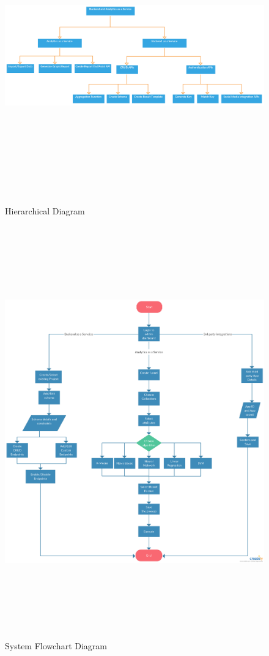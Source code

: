 \documentclass[a4paper,12pt]{report}
\begin{document}
        \begin{figure}[h] \centering
          \includegraphics[width=9.0in, height=5.0in ,angle=90]{images/Hierarchical-Diagram.png}
        \caption{ Hierarchical Diagram}  
        \end{figure}

        \begin{figure}[h]
          \includegraphics[width=6.0in,height=7.0in,angle=0]{images/System-Flowchart-Diagram.png}
        \caption{ System Flowchart Diagram}  
        \end{figure}
\end{document}
